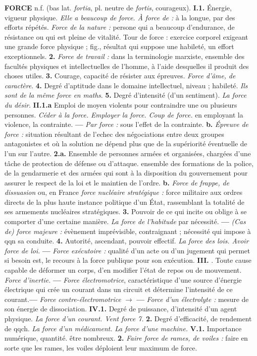 {\bf FORCE} {\sf n.f.} (bas lat. {\it fortia}, pl. neutre de {\it fortis}, courageux). {\bf I.1.} Énergie, vigueur physique. {\it Elle a beaucoup de force. \lb À force de :} à la longue, par des efforts répétés. {\it Force de la nature :} persone qui a beaucoup d'endurance, de résistance ou qui est pleine de vitalité. Tour de force : exercice corporel exigeant une grande force physique ; {\sf fig.}, résultat qui suppose une habileté, un effort exceptionnels. {\bf 2.} {\it Force de travail :} dans la terminologie marxiste, ensemble des facultés physiques et intellectuelles de l'homme, à l'aide desquelles il produit des choses utiles. {\bf 3.} Courage, capacité de résister aux épreuves. {\it Force d'âme, de caractère}. {\bf 4.} Degré d'aptitude dans le domaine intellectuel, niveau ; habileté. {\it Ils sont de la même force en maths}. {\bf 5.} Degré d'intensité (d'un sentiment). {\it La force du désir}. {\bf II.1.a} Emploi de moyen violents pour contraindre une ou plusieurs personnes. {\it Céder à la force. Employer la force. Coup de force.}  en employant la violence, la contrainte. {\bf —} {\it Par force :} sous l'effet de la contrainte. {\bf b.} {\it Épreuve de force :} situation résultant de l'echec des négociations entre deux groupes antagonistes et où la solution ne dépend plus que de la supériorité éventuelle de l'un sur l'autre. {\bf 2.a.} Ensemble de personnes armées et organisées, chargées d'une tâche de protection de défense ou d'attaque.  ensemble des formations de la police, de la gendarmerie et des armées qui sont à la disposition du gouvernement pour assurer le respect de la loi et le maintien de l'ordre. {\bf b.} {\it Force de frappe, de dissuasion} ou, en France {\it force nucléaire stratégique :} force militaire aux ordres directs de la plus haute instance politique d'un État, rassemblant la totalité de ses armements nucléaires stratégiques. {\bf 3.} Pouvoir de ce qui incite ou oblige à se comporter d'une certaine manière. {\it La force de l'habitude}  par nécessité. {\bf —} {\it (Cas de) force majeure :} évènement imprévisible, contraignant ; nécessité qui impose à qqn sa conduite. {\bf 4.} Autorité, ascendant, pouvoir effectif. {\it La force des lois. Avoir force de loi.} {\bf —}  {\it Force exécutoire :} qualité d'un acte ou d'un jugement qui permet si besoin est, le recours à la force publique pour son exécution. {\bf III.} . Toute cause capable de déformer un corps, d'en modifier l'état de repos ou de mouvement. {\it Force d'inertie.} {\bf —} {\it Force électromotrice}, caractéristique d'une source d'énergie électrique qui crée un courant dans un circuit et détermine l'intensité de ce courant.{\bf —} {\it Force contre-électromotrice} $\to$  {\bf —} {\it Force d'un électrolyte :} mesure de son énergie de dissociation. {\bf IV.1.} Degré de puissance, d'intensité d'un agent physique. {\it La force d'un courant. Vent force 7.} {\bf 2.} Degré d'efficacité, de rendement de qqch. {\it La force d'un médicament. La force d'une machine.} {\bf V.1.} Importance numérique, quantité.  être nombreux. {\bf 2.} {\it Faire force de rames, de voiles :} faire en sorte que les rames, les voiles déploient leur maximum de force. 
